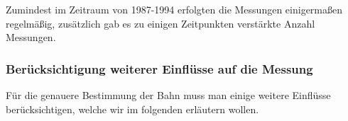 Zumindest im Zeitraum von 1987-1994 erfolgten die Messungen einigermaßen regelmäßig, zusätzlich gab es zu einigen Zeitpunkten verstärkte Anzahl Messungen.\cite{Markwardt2002} %


\subsubsection{Berücksichtigung weiterer Einflüsse auf die Messung}
Für die genauere Bestimmung der Bahn muss man einige weitere Einflüsse berücksichtigen, welche wir im folgenden erläutern wollen.

